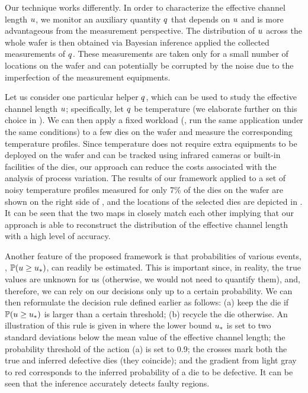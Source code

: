 Our technique works differently.
In order to characterize the effective channel length $u$, we monitor an auxiliary quantity $q$ that depends on $u$ and is more advantageous from the measurement perspective.
The distribution of $u$ across the whole wafer is then obtained via Bayesian inference \cite{gelman2004} applied the collected measurements of $q$.
These measurements are taken only for a small number of locations on the wafer and can potentially be corrupted by the noise due to the imperfection of the measurement equipments.

Let us consider one particular helper $q$, which can be used to study the effective channel length $u$; specifically, let $q$ be temperature (we elaborate further on this choice in ).
We can then apply a fixed workload (\eg, run the same application under the same conditions) to a few dies on the wafer and measure the corresponding temperature profiles.
Since temperature does not require extra equipments to be deployed on the wafer and can be tracked using infrared cameras \cite{mesa-martinez2007} or built-in facilities of the dies, our approach can reduce the costs associated with the analysis of process variation.
The results of our framework applied to a set of noisy temperature profiles measured for only 7\% of the dies on the wafer are shown on the right side of , and the locations of the selected dies are depicted in .
It can be seen that the two maps in  closely match each other implying that our approach is able to reconstruct the distribution of the effective channel length with a high level of accuracy.

Another feature of the proposed framework is that probabilities of various events, \eg, $\mathbb{P}(u \geq u_*)$, can readily be estimated.
This is important since, in reality, the true values are unknown for us (otherwise, we would not need to quantify them), and, therefore, we can rely on our decisions only up to a certain probability.
We can then reformulate the decision rule defined earlier as follows: (a) keep the die if $\mathbb{P}(u \geq u_*)$ is larger than a certain threshold; (b) recycle the die otherwise.
An illustration of this rule is given in  where the lower bound $u_*$ is set to two standard deviations below the mean value of the effective channel length; the probability threshold of the action (a) is set to 0.9; the crosses mark both the true and inferred defective dies (they coincide); and the gradient from light gray to red corresponds to the inferred probability of a die to be defective. It can be seen that the inference accurately detects faulty regions.


